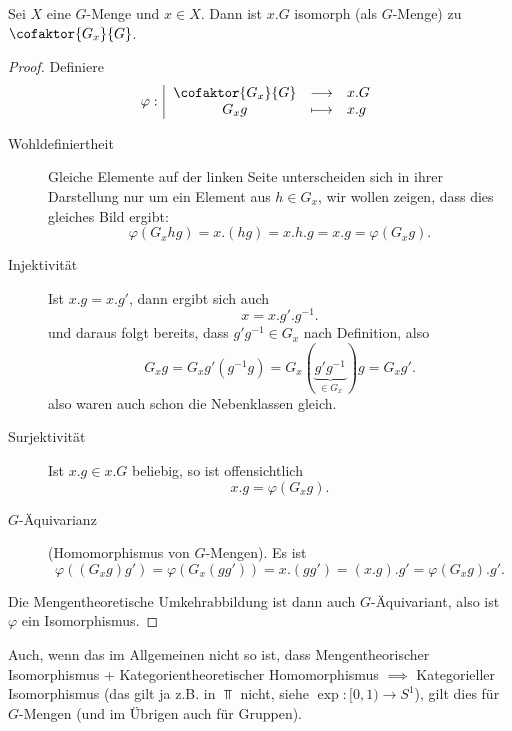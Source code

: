 \begin{lemma}
    Sei $X$ eine  $G$-Menge und  $x\in X$. Dann ist $x.G$ isomorph (als  $G$-Menge) zu  $\cofaktor{G_x}{G}$.
\end{lemma}
\begin{proof}
    Definiere
        \begin{equation*}
        \varphi : \left| \begin{array}{c c l} 
            \cofaktor{G_x}{G} & \longrightarrow & x.G \\
        G_xg & \longmapsto &  x.g
        \end{array} \right.
    \end{equation*}
    \begin{description}
        \item[Wohldefiniertheit] Gleiche Elemente auf der linken Seite unterscheiden sich in ihrer Darstellung nur um ein Element aus $h\in G_x$, wir wollen zeigen, dass dies gleiches Bild ergibt:
            \[
                \varphi (G_xhg) = x.(hg) = x.h.g = x.g = \varphi (G_xg)
            .\] 
        \item[Injektivität] Ist $x.g = x.g'$, dann ergibt sich auch
             \[
            x = x.g'.g^{-1}
            .\] 
            und daraus folgt bereits, dass $g'g^{-1} \in G_x$ nach Definition, also
            \[
                G_xg = G_xg'(g^{-1}g) = G_x(\underbrace{g'g^{-1}}_{\in G_x})g = G_xg'
            .\] 
            also waren auch schon die Nebenklassen gleich.
        \item[Surjektivität] Ist $x.g\in x.G$ beliebig, so ist offensichtlich
            \[
                x.g = \varphi (G_xg)
            .\] 
        \item[$G$-Äquivarianz] (Homomorphismus von $G$-Mengen). Es ist
             \[
                 \varphi ((G_xg)g') = \varphi (G_x(gg')) = x.(gg') = (x.g).g' = \varphi (G_xg).g'
            .\] 
    \end{description}
    Die Mengentheoretische Umkehrabbildung ist dann auch $G$-Äquivariant, also ist  $\varphi $ ein Isomorphismus.
\end{proof}

    \begin{oral}
        Auch, wenn das im Allgemeinen nicht so ist, dass Mengentheorischer Isomorphismus + Kategorientheoretischer Homomorphismus $\implies$ Kategorieller Isomorphismus (das gilt ja z.B. in $\Top$ nicht, siehe  $\exp \colon  [0,1) \to  S^1$), gilt dies für $G$-Mengen (und im Übrigen auch für Gruppen).
    \end{oral}

